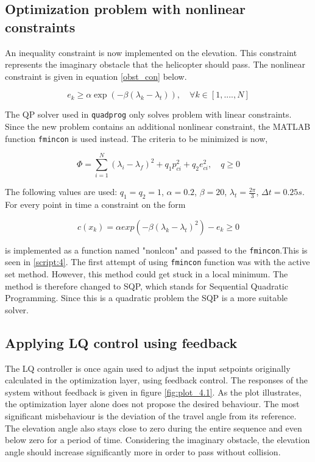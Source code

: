 \documentclass[a4paper, 12pt]{article}\usepackage[utf8]{inputenc}
\begin{document}
\subsection{Optimization problem with nonlinear constraints}
An inequality constraint is now implemented on the elevation. This constraint represents the imaginary obstacle that the helicopter should pass. The nonlinear constraint is given in equation \ref{obst_con} below. 

\begin{equation}\label{obst_con}
    e_k \geq \alpha \exp(-\beta (\lambda_k - \lambda_t) ), \quad \forall k\in [1,....,N]
\end{equation}
 
The QP solver used in \texttt{quadprog} only solves problem with linear constraints. Since the new problem contains an additional nonlinear constraint, the MATLAB function \texttt{fmincon} is used instead. The criteria to be minimized is now, 
 
\begin{equation}
    \Phi=\sum_{i=1}^{N}(\lambda_i-\lambda_f)^2+q_1p_{ci}^2+q_2e_{ci}^2, \quad q\geq 0
\end{equation}
 
The following values are used: $q_1=q_2=1$, $\alpha=0.2$, $\beta=20$, $\lambda_t=\frac{2\pi}{3}$, $\Delta{t}=0.25 s$.
For every point in time a constraint on the form 

\begin{equation}
    c(x_k)=\alpha exp(-\beta(\lambda_k - \lambda_t)^2)-e_k\geq0
\end{equation}

is implemented as a function named "nonlcon" and passed to the \texttt{fmincon}.This is seen in \ref{script:4}. The first attempt of using \texttt{fmincon} function was with the active set method. However, this method could get stuck in a local minimum. The method is therefore changed to SQP, which stands for Sequential Quadratic Programming. Since this is a quadratic problem the SQP is a more suitable solver. 
 
\subsection{Applying LQ control using feedback}\label{5.4}

The LQ controller is once again used to adjust the input setpoints originally calculated in the optimization layer, using feedback control. The responses of the system without feedback is given in figure \ref{fig:plot_4.1}. As the plot illustrates, the optimization layer alone does not propose the desired behaviour. The most significant misbehaviour is the deviation of the travel angle from its reference. The elevation angle also stays close to zero during the entire sequence and even below zero for a period of time. Considering the imaginary obstacle, the elevation angle should increase significantly more in order to pass without collision.
\end{document}
